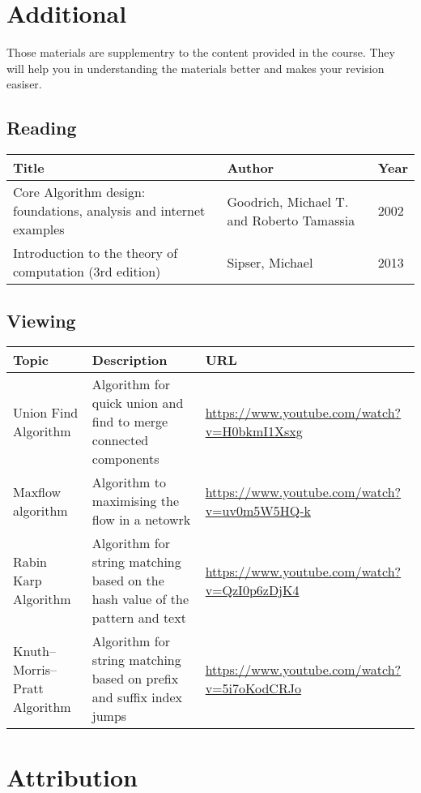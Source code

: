 \section*{Additional}
Those materials are supplementry to the content provided in the course. 
They will help you in understanding the materials better and makes your revision easiser. 
\subsection*{Reading}
\begin{tabularx}{\textwidth} {|X|X|l|}
  \hline
  
  Title & Author & Year\\ \hline
    Core Algorithm design: foundations, analysis and internet examples &
    Goodrich, Michael T. and Roberto Tamassia &
    2002 \\ \hline
    Introduction to the theory of computation (3rd edition) &
    Sipser, Michael&
    2013\\ \hline
\end{tabularx}

\subsection*{Viewing}
\begin{tabularx}{\textwidth} {|X|X|l|}
  \hline
  
  Topic & Description & URL \\ \hline
    Union Find Algorithm &
    Algorithm for quick union and find to merge connected components &
    \url{https://www.youtube.com/watch?v=H0bkmI1Xsxg} \\ \hline
    Maxflow algorithm &
    Algorithm to maximising the flow in a netowrk &
    \url{https://www.youtube.com/watch?v=uv0m5W5HQ-k}\\ \hline
    Rabin Karp Algorithm &
    Algorithm for string matching based on the hash value of the pattern and text &
    \url{https://www.youtube.com/watch?v=QzI0p6zDjK4} \\ \hline
    Knuth–Morris–Pratt Algorithm &
    Algorithm for string matching based on prefix and suffix index jumps &
    \url{https://www.youtube.com/watch?v=5i7oKodCRJo} \\ \hline

    \end{tabularx}

\section*{Attribution}

